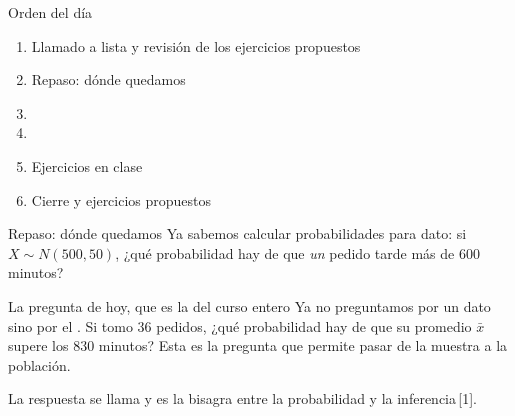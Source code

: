 \documentclass[aspectratio=169,10pt]{beamer}
\begin{document}
\portada

\begin{frame}{Orden del día}
  \begin{enumerate}
    \item Llamado a lista y revisión de los ejercicios propuestos
    \item Repaso: dónde quedamos
    \item {}
    \item {}
    \item Ejercicios en clase
    \item Cierre y ejercicios propuestos
  \end{enumerate}
\end{frame}

\begin{frame}{Repaso: dónde quedamos}
  Ya sabemos calcular probabilidades para  dato: si
  $X\sim N(500,50)$, ¿qué probabilidad hay de que \emph{un} pedido tarde más de
  600 minutos?

  \vspace{0.25cm}
  \begin{alertblock}{La pregunta de hoy, que es la del curso entero}
    \footnotesize
    Ya no preguntamos por un dato sino por el . Si tomo 36 pedidos, ¿qué probabilidad hay de que su promedio
    $\bar{x}$ supere los 830 minutos? Esta es la pregunta que permite pasar de
    la muestra a la población.
  \end{alertblock}

  \vspace{0.15cm}
  {\footnotesize\color{uniGris} La respuesta se llama  y es la bisagra entre la probabilidad y la
  inferencia\,[1].}
\end{frame}

\end{document}
